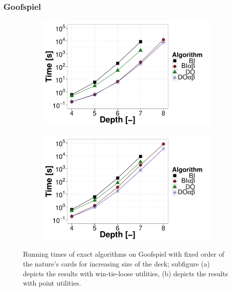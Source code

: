 \subsubsection{Goofspiel}
\begin{figure} [t]
\centering
	\begin{subfigure}{0.49\textwidth}
 		\includegraphics[width=1\textwidth]{figures/GS-BT-NF.pdf}\caption{}\label{fig:off:res:gs-bt}
 	\end{subfigure}
	\begin{subfigure}{0.49\textwidth}
 		\includegraphics[width=1\textwidth]{figures/GS-BF-NF.pdf}\caption{}\label{fig:off:res:gs-bf}
 	\end{subfigure}
\caption{Running times of exact algorithms on Goofspiel with fixed order of the nature's cards for increasing size of the deck; subfigure (a) depicts the results with win-tie-loose utilities, (b) depicts the results with point utilities.} \label{fig:off:res:gs}
\end{figure}

